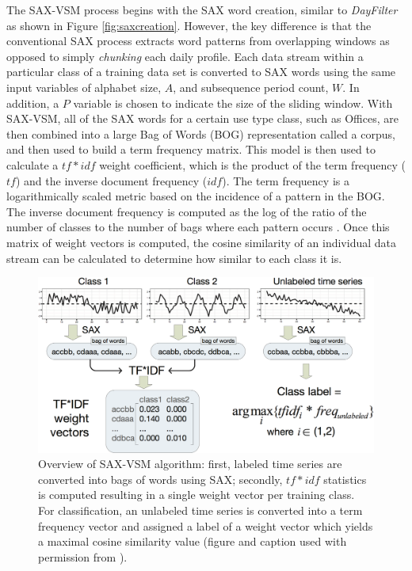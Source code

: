 The SAX-VSM process begins with the SAX word creation, similar to \emph{DayFilter} as shown in Figure \ref{fig:saxcreation}. However, the key difference is that the conventional SAX process extracts word patterns from overlapping windows as opposed to simply \emph{chunking} each daily profile. Each data stream within a particular class of a training data set is converted to SAX words using the same input variables of alphabet size, $A$, and subsequence period count, $W$. In addition, a $P$ variable is chosen to indicate the size of the sliding window. With SAX-VSM, all of the SAX words for a certain use type class, such as Offices, are then combined into a large Bag of Words (BOG) representation called a corpus, and then used to build a term frequency matrix. This model is then used to calculate a $tf*idf$ weight coefficient, which is the product of the term frequency ($tf$) and the inverse document frequency ($idf$). The term frequency is a logarithmically scaled metric based on the incidence of a pattern in the BOG. The inverse document frequency is computed as the log of the ratio of the number of classes to the number of bags where each pattern occurs \citep{Manning}. Once this matrix of weight vectors is computed, the cosine similarity of an individual data stream can be calculated to determine how similar to each class it is. 

\begin{figure}[ht!]
\begin{center}
\includegraphics[width=0.98\columnwidth]{figures/jmotif/jmotif}
\caption{Overview of SAX-VSM algorithm: first, labeled time series are converted into bags of words using SAX; secondly, $tf*idf$ statistics is computed resulting in a single weight vector per training class. For classification, an unlabeled time series is converted into a term frequency vector and assigned a label of a weight vector which yields a maximal cosine similarity value (figure and caption used with permission from \citep{senin_sax-vsm:_2013}).
\label{fig:saxvsm_overview}%
}
\end{center}
\end{figure}

